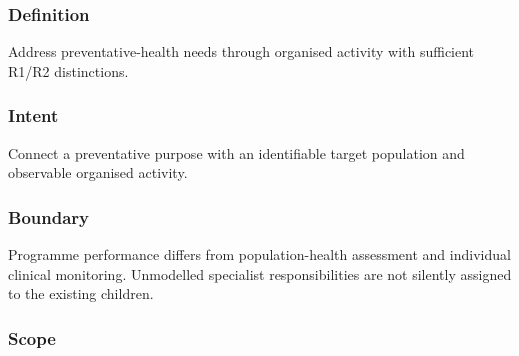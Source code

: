 \subsubsection*{Definition}

Address preventative-health needs through organised activity with sufficient R1/\allowbreak{}R2 distinctions.

\subsubsection*{Intent}

Connect a preventative purpose with an identifiable target population and observable organised activity.

\subsubsection*{Boundary}

Programme performance differs from population-health assessment and individual clinical monitoring. Unmodelled specialist responsibilities are not silently assigned to the existing children.

\subsubsection*{Scope}
